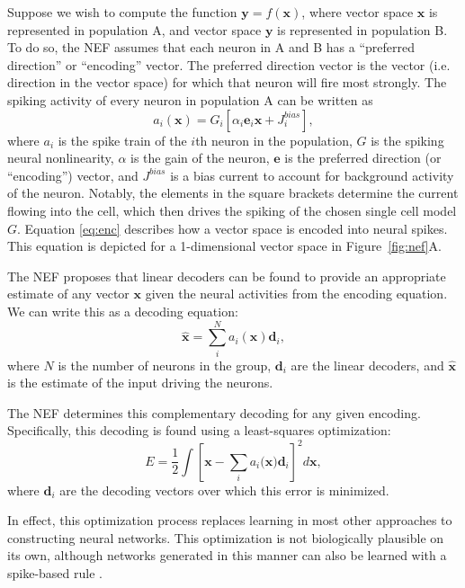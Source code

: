 \documentclass{frontiersSCNS}
\begin{document}
Suppose we wish to compute the function
$\mathbf{y}=f(\mathbf{x})$,
where vector space $\mathbf{x}$
is represented in population A,
and vector space $\mathbf{y}$
is represented in population B.
To do so, the NEF assumes that
each neuron in A and B has a
``preferred direction'' or ``encoding'' vector.
The preferred direction vector
is the vector (i.e. direction in the vector space)
for which that neuron will fire most strongly.
The spiking activity of every neuron
in population A can be written as
\begin{equation} \label{eq:enc}
  a_{i}(\mathbf{x})=G_{i}[\alpha_{i}\mathbf{e}_{i}\mathbf{x}+J_{i}^{bias}],
\end{equation}
where $a_{i}$ is the spike train
of the $i$th neuron in the population,
$G$ is the spiking neural nonlinearity,
$\alpha$ is the gain of the neuron,
$\mathbf{e}$ is the preferred direction
(or ``encoding'') vector,
and $J^{bias}$ is a bias current
to account for background activity of the neuron.
Notably, the elements in the square brackets
determine the current flowing into the cell,
which then drives the spiking
of the chosen single cell model $G$.
Equation \eqref{eq:enc} describes
how a vector space
is encoded into neural spikes.
This equation is depicted
for a 1-dimensional vector space
in Figure~\ref{fig:nef}A.

The NEF proposes that linear decoders
can be found to provide an appropriate
estimate of any vector $\mathbf{x}$
given the neural activities from
the encoding equation.
We can write this as a decoding equation:
\begin{equation} \label{eq:dec}
  \hat{\mathbf{x}}=\sum_{i}^{N}a_{i}\mathbf{(x)}\mathbf{d}_{i},
\end{equation}
where $N$ is the number of neurons in the group,
$\mathbf{d}_{i}$ are the linear decoders,
and $\hat{\mathbf{x}}$ is the estimate of
the input driving the neurons.

The NEF determines this complementary decoding
for any given encoding.
Specifically, this decoding is found
using a least-squares optimization:
\begin{equation} \label{eq:error}
  E=\frac{1}{2}\int[\mathbf{x}-\sum_{i}a_{i}(\mathbf{x)}\mathbf{d}_{i}]^{2}d\mathbf{x},
\end{equation}
where $\mathbf{d}_{i}$ are the decoding vectors
over which this error is minimized.

In effect, this optimization process
replaces learning in most other
approaches to constructing neural networks.
This optimization is not
biologically plausible on its own,
although networks generated in
this manner can also be learned
with a spike-based rule \cite{macneil2011}.
\end{document}
